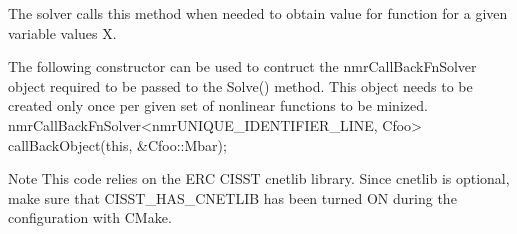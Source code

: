 \begin{DoxyVerb}  The solver calls this method when needed to obtain value for function for
  a given variable values X.

  The following constructor can be used to contruct the nmrCallBackFnSolver object
  required to be passed to the Solve() method. This object needs to be created
  only once per given set of nonlinear functions to be minized.
      nmrCallBackFnSolver<nmrUNIQUE_IDENTIFIER_LINE, Cfoo> callBackObject(this, &Cfoo::Mbar);
\end{DoxyVerb}


\begin{DoxyNote}{Note}
This code relies on the E\-R\-C C\-I\-S\-S\-T cnetlib library. Since cnetlib is optional, make sure that C\-I\-S\-S\-T\-\_\-\-H\-A\-S\-\_\-\-C\-N\-E\-T\-L\-I\-B has been turned O\-N during the configuration with C\-Make. 
\end{DoxyNote}


